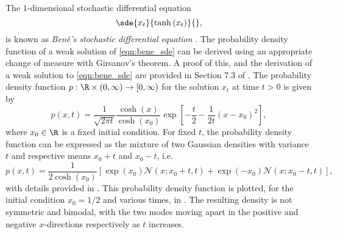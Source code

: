 \begin{example}\label{ex:bene_sde}
	The \(1\)-dimensional stochastic differential equation
	\begin{equation}
		\sde{x_t}{\tanh\left(x_t\right)}{},
		\label{eqn:bene_sde}
	\end{equation}
	is known as \emph{Ben\^e's stochastic differential equation} \citep{SarkkaSolin_2019_AppliedStochasticDifferential}.
	The probability density function of a weak solution of \cref{eqn:bene_sde} can be derived using an appropriate change of measure with Girsanov's theorem.
	A proof of this, and the derivation of a weak solution to \cref{eqn:bene_sde} are provided in Section 7.3 of \citet{SarkkaSolin_2019_AppliedStochasticDifferential}.
	The probability density function \(p: \R \times \left(0,\infty\right) \to \left[0,\infty\right)\) for the solution \(x_t\) at time \(t > 0\) is given by
	\begin{equation}\label{eqn:bene_sde_pdf}
		p(x,t) = \frac{1}{\sqrt{2\pi t}}\frac{\cosh\left(x\right)}{\cosh\left(x_0\right)}\exp\left[-\frac{t}{2} - \frac{1}{2t}\left(x - x_0\right)^2\right],
	\end{equation}
	where \(x_0 \in \R\) is a fixed initial condition.
	For fixed \(t\), the probability density function can be expressed as the mixture of two Gaussian densities with variance \(t\) and respective means \(x_0 + t\) and \(x_0 - t\), i.e.
	\[
		p(x,t) = \frac{1}{2\cosh\left(x_0\right)}\left[\exp\left(x_0\right)\mathcal{N}\!\left(x; x_0 + t, t\right) + \exp\left(-x_0\right)\mathcal{N}\!\left(x; x_0 - t, t\right)\right],
	\]
	with details provided in .
	This probability density function is plotted, for the initial condition \(x_0 = 1/2\) and various times, in .
	The resulting density is not symmetric and bimodal, with the two modes moving apart in the positive and negative \(x\)-directions respectively as \(t\) increases.
\end{example}


\newcommand{\plotbenepdf}[2]{
	\begin{tikzpicture}\begin{axis}[
				ymin=0.0,
				xmin=-10.0,
				xmax=10.0,
				axis lines=center,
				axis on top=true,
				domain=-10:10,
				ylabel=$p$,
				xlabel=$x$,
				ytick=\empty,
				yticklabels={},
			]
			\addplot [mark=none,draw=black,thick,samples=500] {cosh(\x)*exp(-#2/2-1/(2 * #2)*(\x-#1)^2)/((2 * pi * #2)^(1/2) * cosh(#1))};
		\end{axis}
	\end{tikzpicture}
}

